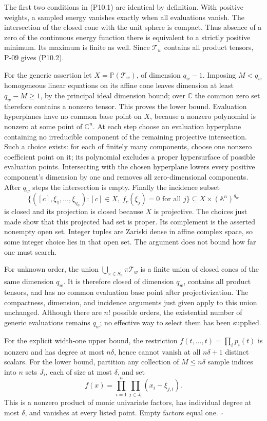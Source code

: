 The first two conditions in (P10.1) are identical by definition. With positive weights, a sampled energy vanishes exactly when all evaluations vanish. The intersection of the closed cone with the unit sphere is compact. Thus absence of a zero of the continuous energy function there is equivalent to a strictly positive minimum. Its maximum is finite as well. Since $\mathcal T_w$ contains all product tensors, P-09 gives (P10.2).

For the generic assertion let $X=\mathbb P(\mathcal T_w)$, of dimension $q_w-1$. Imposing $M<q_w$ homogeneous linear equations on its affine cone leaves dimension at least $q_w-M\ge1$, by the principal ideal dimension bound; over $\mathbb C$ the common zero set therefore contains a nonzero tensor. This proves the lower bound. Evaluation hyperplanes have no common base point on $X$, because a nonzero polynomial is nonzero at some point of $\mathbb C^n$. At each step choose an evaluation hyperplane containing no irreducible component of the remaining projective intersection. Such a choice exists: for each of finitely many components, choose one nonzero coefficient point on it; its polynomial excludes a proper hypersurface of possible evaluation points. Intersecting with the chosen hyperplane lowers every positive component's dimension by one and removes all zero-dimensional components. After $q_w$ steps the intersection is empty. Finally the incidence subset
\[
 \{([c],\xi_1,\ldots,\xi_{q_w}):
      [c]\in X,\ f_c(\xi_j)=0\text{ for all }j\}
 \subseteq X\times(\mathbb A^n)^{q_w}
\]
is closed and its projection is closed because $X$ is projective. The choices just made show that this projected bad set is proper. Its complement is the asserted nonempty open set. Integer tuples are Zariski dense in affine complex space, so some integer choice lies in that open set. The argument does not bound how far one must search.

For unknown order, the union $\bigcup_{\pi\in S_n}\pi\mathcal T_w$ is a finite union of closed cones of the same dimension $q_w$. It is therefore closed of dimension $q_w$, contains all product tensors, and has no common evaluation base point after projectivization. The compactness, dimension, and incidence arguments just given apply to this union unchanged. Although there are $n!$ possible orders, the existential number of generic evaluations remains $q_w$; no effective way to select them has been supplied.

For the explicit width-one upper bound, the restriction
$f(t,\ldots,t)=\prod_i p_i(t)$ is nonzero and has degree at most $n\delta$, hence cannot vanish at all $n\delta+1$ distinct scalars. For the lower bound, partition any collection of $M\le n\delta$ sample indices into $n$ sets $J_i$, each of size at most $\delta$, and set
\[
 f(x)=\prod_{i=1}^n\prod_{j\in J_i}(x_i-\xi_{j,i}).
\]
This is a nonzero product of monic univariate factors, has individual degree at most $\delta$, and vanishes at every listed point. Empty factors equal one. $\square$

